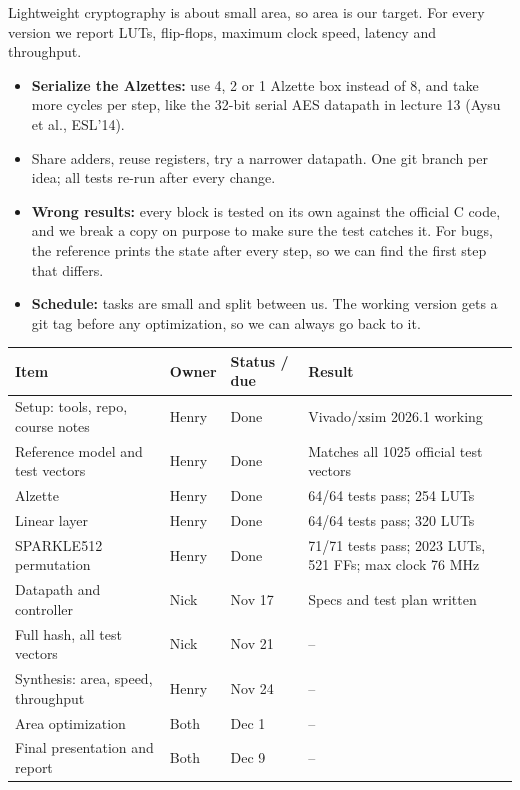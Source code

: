 \documentclass[10pt]{article}
\newcommand{\sect}[1]{\vspace{1pt}{\large\bfseries #1}\par}
\begin{document}
\sect{Optimization target: area, and planned optimizations}
Lightweight cryptography is about small area, so area is our target. For every version we report
LUTs, flip-flops, maximum clock speed, latency and throughput.
\begin{itemize}
\item \textbf{Serialize the Alzettes:} use 4, 2 or 1 Alzette box instead of 8, and take more cycles per step,
like the 32-bit serial AES datapath in lecture 13 (Aysu et al., ESL'14).
\item Share adders, reuse registers, try a narrower datapath. One git branch per idea; all tests re-run after every change.
\end{itemize}

\sect{Risk management}
\begin{itemize}
\item \textbf{Wrong results:} every block is tested on its own against the official C code, and we break a copy
on purpose to make sure the test catches it. For bugs, the reference prints the state after every step, so we can find the first step that differs.
\item \textbf{Schedule:} tasks are small and split between us. The working version gets a git tag
before any optimization, so we can always go back to it.
\end{itemize}

\sect{Progress and plan}
{\small\begin{tabular}{@{}llll@{}}
\toprule
Item & Owner & Status / due & Result \\
\midrule
Setup: tools, repo, course notes & Henry & Done & Vivado/xsim 2026.1 working \\
Reference model and test vectors & Henry & Done & Matches all 1025 official test vectors \\
Alzette & Henry & Done & 64/64 tests pass; 254 LUTs \\
Linear layer & Henry & Done & 64/64 tests pass; 320 LUTs \\
SPARKLE512 permutation & Henry & Done & 71/71 tests pass; 2023 LUTs, 521 FFs; max clock 76 MHz \\
Datapath and controller & Nick & Nov 17 & Specs and test plan written \\
Full hash, all test vectors & Nick & Nov 21 & -- \\
Synthesis: area, speed, throughput & Henry & Nov 24 & -- \\
Area optimization & Both & Dec 1 & -- \\
Final presentation and report & Both & Dec 9 & -- \\
\bottomrule
\end{tabular}}
\end{document}
